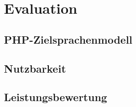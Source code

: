 \chapter{Evaluation}
\label{chap:evaluation}



\section{PHP-Zielsprachenmodell}
\label{sec:php_target_language_model}

\section{Nutzbarkeit}
\label{sec:usability}

\section{Leistungsbewertung}
\label{sec:performance_measurement}


